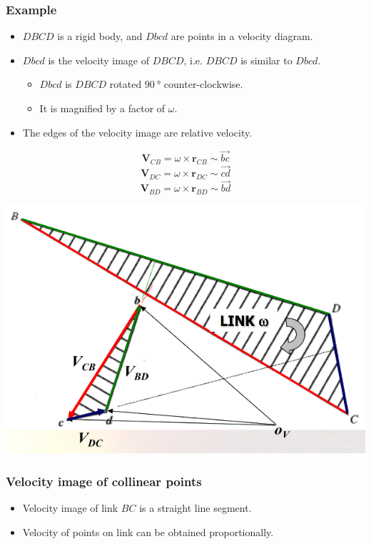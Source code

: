 \documentclass[11pt]{article}
\begin{document}
 \newpage
\subsubsection{Example}
\label{sec:org26e6b76}
\begin{itemize}
\item \(DBCD\) is a rigid body, and \(Dbcd\) are points in a velocity diagram.
\item \(Dbcd\) is the velocity image of \(DBCD\), i.e. \(DBCD\) is similar to \(Dbcd\).
\begin{itemize}
\item \(Dbcd\) is \(DBCD\) rotated \(\qty{90}{\degree}\) counter-clockwise.
\item It is magnified by a factor of \(\omega\).
\end{itemize}
\item The edges of the velocity image are relative velocity.
\end{itemize}

\[\boldsymbol{V}_{CB} = \omega \times \boldsymbol{r}_{CB} \sim \vec{bc}\]
\[\boldsymbol{V}_{DC} = \omega \times \boldsymbol{r}_{DC} \sim \vec{cd}\]
\[\boldsymbol{V}_{BD} = \omega \times \boldsymbol{r}_{BD} \sim \vec{bd}\]

\begin{center}
\includegraphics[width=.9\linewidth]{./images/velocity-image-example.png}
\end{center}

 \newpage
\subsubsection{Velocity image of collinear points}
\label{sec:org981637e}
\begin{itemize}
\item Velocity image of link \(BC\) is a straight line segment.
\item Velocity of points on link can be obtained proportionally.
\end{itemize}
\end{document}
